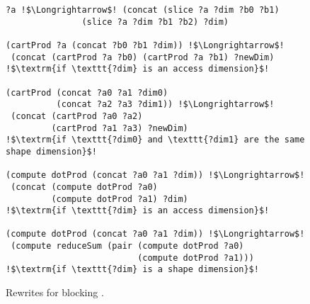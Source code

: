 \begin{figure}
\begin{lstlisting}[escapechar=!]
?a !$\Longrightarrow$! (concat (slice ?a ?dim ?b0 ?b1)
               (slice ?a ?dim ?b1 ?b2) ?dim)
               
(cartProd ?a (concat ?b0 ?b1 ?dim)) !$\Longrightarrow$!
 (concat (cartProd ?a ?b0) (cartProd ?a ?b1) ?newDim)
!$\textrm{if \texttt{?dim} is an access dimension}$!
 
(cartProd (concat ?a0 ?a1 ?dim0) 
          (concat ?a2 ?a3 ?dim1)) !$\Longrightarrow$!
 (concat (cartProd ?a0 ?a2) 
         (cartProd ?a1 ?a3) ?newDim)
!$\textrm{if \texttt{?dim0} and \texttt{?dim1} are the same shape dimension}$!

(compute dotProd (concat ?a0 ?a1 ?dim)) !$\Longrightarrow$!
 (concat (compute dotProd ?a0)
         (compute dotProd ?a1) ?dim)
!$\textrm{if \texttt{?dim} is an access dimension}$!

(compute dotProd (concat ?a0 ?a1 ?dim)) !$\Longrightarrow$!
 (compute reduceSum (pair (compute dotProd ?a0)
                          (compute dotProd ?a1)))
!$\textrm{if \texttt{?dim} is a shape dimension}$!
\end{lstlisting}
\vspace{-1em}
\caption{
Rewrites for blocking .
}
\label{fig:all-blocking-rewrites}
\end{figure}

